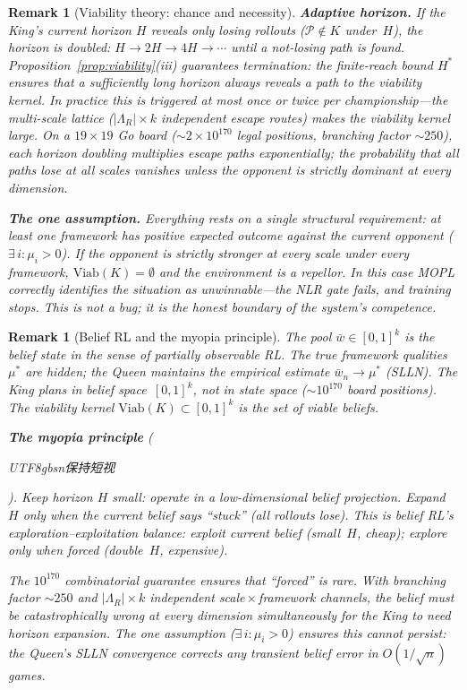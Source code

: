 \documentclass[11pt,a4paper]{article}
\newtheorem{remark}[theorem]{Remark}
\newcommand{\cP}{\mathcal{P}}
\begin{document}
\begin{remark}[Viability theory: chance and necessity]
\medskip\noindent
\textbf{Adaptive horizon.}\;
If the King's current horizon $H$ reveals only losing
rollouts ($\cP \notin K$ under~$H$), the horizon is doubled:
$H \to 2H \to 4H \to \cdots$
until a not-losing path is found.
Proposition~\ref{prop:viability}\textup{(iii)} guarantees
termination: the finite-reach bound $H^*$ ensures
that a sufficiently long horizon always reveals a path
to the viability kernel.
In practice this is triggered at most once or twice
per championship---the multi-scale lattice
($|\Lambda_R| \times k$ independent escape routes)
makes the viability kernel large.
On a $19 \times 19$ Go board
($\sim\!2 \times 10^{170}$ legal positions,
branching factor $\sim\!250$),
each horizon doubling multiplies escape paths
exponentially; the probability that \emph{all} paths
lose at \emph{all} scales vanishes unless the opponent
is strictly dominant at every dimension.

\medskip\noindent
\textbf{The one assumption.}\;
Everything rests on a single structural requirement:
\emph{at least one framework has positive expected outcome
against the current opponent} ($\exists\, i : \mu_i > 0$).
If the opponent is strictly stronger at every scale
under every framework, $\mathrm{Viab}(K) = \emptyset$ and
the environment is a repellor.
In this case MOPL correctly identifies the situation
as unwinnable---the NLR gate fails, and training stops.
This is not a bug; it is the honest boundary of the
system's competence.
\end{remark}

\begin{remark}[Belief RL and the myopia principle]%
\label{rem:belief-rl}
\color{black!60}%
The pool $\bar{w} \in [0,1]^k$ \emph{is} the belief state
in the sense of partially observable RL\@.
The true framework qualities $\mu^*$ are hidden;
the Queen maintains the empirical estimate
$\bar{w}_n \to \mu^*$ (SLLN)\@.
The King plans in belief space~$[0,1]^k$,
not in state space ($\sim\!10^{170}$ board positions).
The viability kernel
$\mathrm{Viab}(K) \subset [0,1]^k$
is the set of \emph{viable beliefs}.

\medskip\noindent
\textbf{The myopia principle}
(\begin{CJK}{UTF8}{gbsn}保持短视\end{CJK}).\;
Keep horizon $H$ small: operate in a low-dimensional belief
projection.  Expand $H$ only when the current belief says
``stuck'' (all rollouts lose).
This is belief RL's exploration--exploitation balance:
\emph{exploit} current belief (small~$H$, cheap);
\emph{explore} only when forced (double~$H$, expensive).

\medskip\noindent
The $10^{170}$ combinatorial guarantee ensures that
``forced'' is rare.
With branching factor $\sim\!250$ and
$|\Lambda_R| \times k$ independent
scale\,$\times$\,framework channels,
the belief must be catastrophically wrong at every
dimension simultaneously for the King to need horizon
expansion.
The one assumption ($\exists\, i : \mu_i > 0$) ensures
this cannot persist: the Queen's SLLN convergence
corrects any transient belief error in $O(1/\sqrt{n})$
games.
\end{remark}
\end{document}
